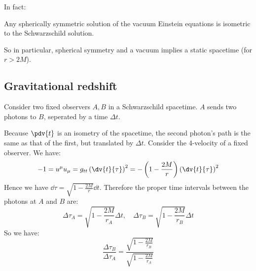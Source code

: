 \documentclass{jknotes}
\begin{document}
In fact:
\begin{theorem}[Birkhoff]
    Any spherically symmetric solution of the vacuum Einstein equations is isometric to the Schwarzschild solution.
\end{theorem}
So in particular, spherical symmetry and a vacuum implies a static spacetime (for \(r>2M\)).

\subsection{Gravitational redshift}
Consider two fixed observers \(A,B\) in a Schwarzschild spacetime. \(A\) sends two photons to \(B\), seperated by a time \(\Delta t\).

\begin{wrapfigure}{l}{0.4\linewidth}
    \centering
\end{wrapfigure}
Because \(\pdv{t}\) is an isometry of the spacetime, the second photon's path is the same as that of the first, but translated by \(\Delta t\). Consider the 4-velocity of a fixed observer. We have:
\begin{equation}
    -1 = u^\mu u_\mu = g_{tt}\left(\dv{t}{\tau}\right)^2 = - \left( 1-\frac{2M}{r} \right)\left(\dv{t}{\tau}\right)^2
\end{equation}
Hence we have \(\dd{\tau} = \sqrt{1 - \frac{2M}{r}}\dd{t}\). Therefore the proper time intervals between the photons at \(A\) and \(B\) are:
\begin{equation}
    \Delta\tau_A = \sqrt{1-\frac{2M}{r_A}}\Delta t
    ,\quad
    \Delta\tau_B = \sqrt{1-\frac{2M}{r_B}}\Delta t
\end{equation}
So we have:
\begin{equation}
    \frac{\Delta \tau_B}{\Delta \tau_A} = \frac{\sqrt{1 - \frac{2M}{r_B}}}{\sqrt{1-\frac{2M}{r_A}}}
\end{equation}
\end{document}
